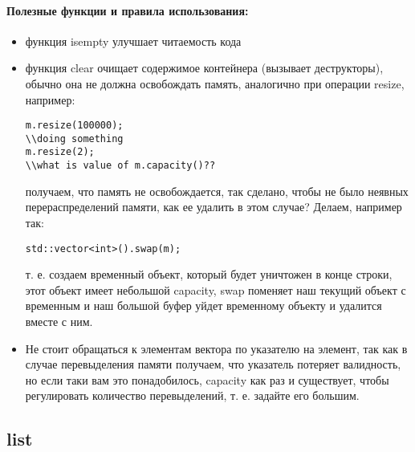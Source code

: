 \paragraph{Полезные функции и правила использования:}
\begin{itemize}
\item функция isempty улучшает читаемость кода

\item функция clear очищает содержимое контейнера (вызывает деструкторы), обычно она не должна освобождать память, аналогично при операции resize, например:
\begin{lstlisting}
m.resize(100000);
\\doing something
m.resize(2);
\\what is value of m.capacity()??
\end{lstlisting}
получаем, что память не освобождается, так сделано, чтобы не было неявных перераспределений памяти, как ее удалить в этом случае? Делаем, например так:
\begin{lstlisting}
std::vector<int>().swap(m);
\end{lstlisting}
т. е. создаем временный объект, который будет уничтожен в конце строки, этот объект имеет небольшой capacity, swap поменяет наш текущий объект с временным и наш
большой буфер уйдет временному объекту и удалится вместе с ним.

\item Не стоит обращаться к элементам вектора по указателю на элемент, так как в случае перевыделения памяти получаем, что указатель потеряет валидность, но если
таки вам это понадобилось, capacity как раз и существует, чтобы регулировать количество перевыделений, т. е. задайте его большим.
\end{itemize}

\subsection{list}

